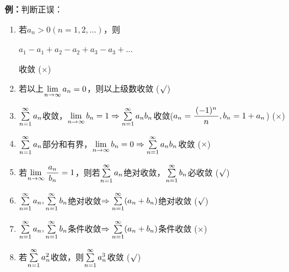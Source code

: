 \begin{center}
\end{center}

{\bf 例：}判断正误：
\begin{enumerate}[(1)]
  \setlength{\itemindent}{1cm}
  \item 若$a_n>0(n=1,2,\ldots)$，则\\
  \centerline{$a_1-a_1+a_2-a_2+a_3-a_3+\ldots $}
  收敛 \hfill ({$\times$})
  \item 若以上$\limn a_n=0$，则以上级数收敛 \hfill
  ({$\surd$})
  \item $\sumn a_n$收敛，$\limn b_n=1\Rightarrow\sumn
  a_nb_n$收敛($a_n=\df{(-1)^n}{n},b_n=1+a_n$) \hfill ({$\times$})
  \item $\sumn a_n$部分和有界，$\limn b_n=0\Rightarrow\sumn a_nb_n$收敛
  \hfill ({$\times$})
  \item 若$\limn\df{a_n}{b_n}=1$，则若$\sumn a_n$绝对收敛，$\sumn b_n$必收敛 \hfill
  ({$\surd$})
  \item $\sumn a_n,\sumn b_n$绝对收敛$\Rightarrow\sumn (a_n+b_n)$绝对收敛 \hfill
  ({$\surd$})
  \item $\sumn a_n,\sumn b_n$条件收敛$\Rightarrow\sumn (a_n+b_n)$条件收敛 \hfill
  ({$\times$})
  \item 若$\sumn a_n^2$收敛，则$\sumn a_n^3$收敛 \hfill
  ({$\surd$})
\end{enumerate}

